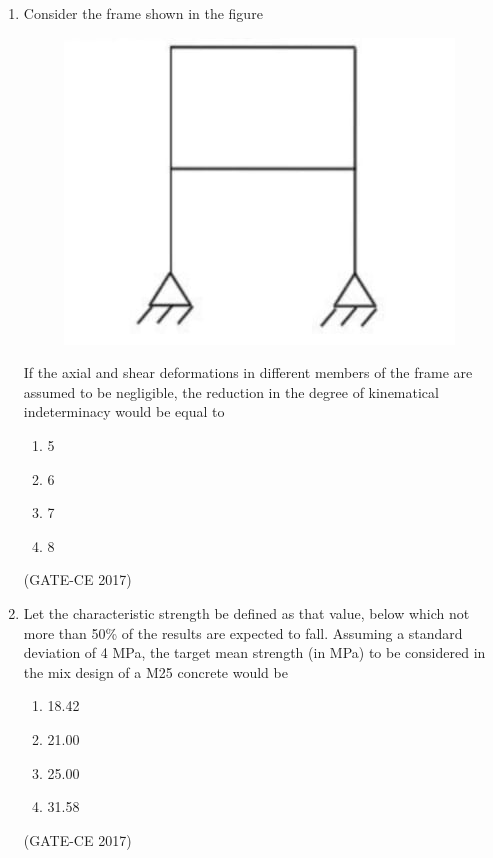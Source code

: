 \documentclass[journal,12pt,onecolumn]{article}
\theoremstyle{remark}
\begin{document}
\begin{enumerate}
    \item Consider the frame shown in the figure 
    \begin{figure}[H]
    \centering
    \includegraphics[width=0.7\columnwidth]{q14.jpg}  
    \caption{}
    \label{fig:5}
    \end{figure}
    If the axial and shear deformations in different members of the frame are assumed to be negligible, the reduction in the degree of kinematical indeterminacy would be equal to
    \begin{multicols}{4}
    \begin{enumerate}
        \item 5  
        \item 6  
        \item 7  
        \item 8  
    \end{enumerate}
    \end{multicols}
    \hfill (GATE-CE 2017)

    \item Let the characteristic strength be defined as that value, below which not more than 50\% of the results are expected to fall. Assuming a standard deviation of 4 MPa, the target mean strength (in MPa) to be considered in the mix design of a M25 concrete would be
    \begin{multicols}{4}
    \begin{enumerate}
        \item 18.42  
        \item 21.00  
        \item 25.00  
        \item 31.58  
    \end{enumerate}
    \end{multicols}
    \hfill (GATE-CE 2017)


\end{enumerate}
\end{document}
